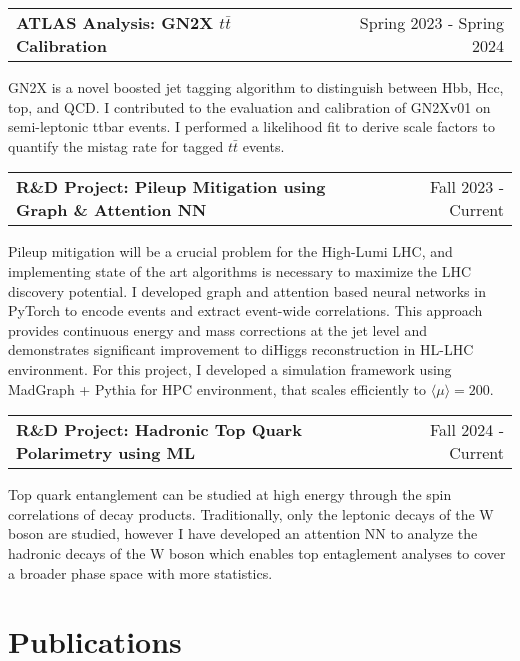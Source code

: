 \documentclass[a4paper,12pt]{article}
\makeatletter
\newenvironment{jobshort}[2]
    {
    \begin{tabularx}{\linewidth}{@{}l X r@{}}
    \textbf{#1} & \hfill &  #2 \\[3.75pt]
    \end{tabularx}
    }
    {
    }
\makeatother
\begin{document}
\begin{jobshort}{ATLAS Analysis: GN2X $t\bar{t}$ Calibration}{Spring 2023 - Spring 2024}
GN2X is a novel boosted jet tagging algorithm to distinguish between Hbb, Hcc, top, and QCD.
I contributed to the evaluation and calibration of GN2Xv01 on semi-leptonic ttbar events.
I performed a likelihood fit to derive scale factors to quantify the mistag rate for tagged $t\bar{t}$ events.
\end{jobshort}

\begin{jobshort}{R\&D Project: Pileup Mitigation using Graph \& Attention NN}{Fall 2023 - Current}
Pileup mitigation will be a crucial problem for the High-Lumi LHC, and implementing state of the art algorithms is necessary to maximize the LHC discovery potential.
I developed graph and attention based neural networks in PyTorch to encode events and extract event-wide correlations.
This approach provides continuous energy and mass corrections at the jet level and demonstrates significant improvement to diHiggs reconstruction in HL-LHC environment\cite{PAKDD}.
For this project, I developed a simulation framework using MadGraph + Pythia for HPC environment, that scales efficiently to $\langle \mu \rangle=200$.
\end{jobshort}

\begin{jobshort}{R\&D Project: Hadronic Top Quark Polarimetry using ML}{Fall 2024 - Current}
Top quark entanglement can be studied at high energy through the spin correlations of decay products.
Traditionally, only the leptonic decays of the W boson are studied, however I have developed an attention NN to analyze the hadronic decays of the W boson which enables top entaglement analyses to cover a broader phase space with more statistics.
\end{jobshort}

\section{Publications}
\begin{refsection}
\nocite{*}
\printbibliography[heading=none]
\end{refsection}

\end{document}
